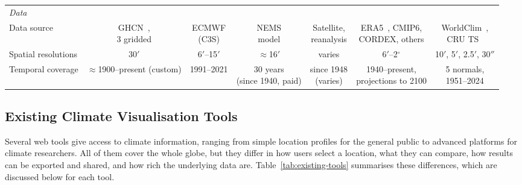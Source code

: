 \begin{table}
\begin{tabular*}{\textheight}{@{\extracolsep{\fill}}lcccccc}
    \midrule
    \multicolumn{7}{l}{\textit{Data}} \\
    Data source & \shortstack{GHCN~\cite{lawrimore2011ghcnm},\\3 gridded}
      & \shortstack{ECMWF\\(C3S)} & \shortstack{NEMS\\model} & \shortstack{Satellite,\\reanalysis}
      & \shortstack{ERA5~\cite{hersbach2020era5}, CMIP6,\\CORDEX, others}
      & \shortstack{WorldClim~\cite{fick2017worldclim},\\CRU TS~\cite{harris2020version}} \\
    Spatial resolutions & 30$'$ & 6$'$--15$'$ & $\approx$16$'$ & varies & 6$'$--2$^\circ$
      & 10$'$, 5$'$, 2.5$'$, 30$''$ \\
    Temporal coverage & \shortstack{$\approx$1900--present\\(custom)} & 1991--2021
      & \shortstack{30 years\\(since 1940, paid)} & \shortstack{since 1948\\(varies)}
      & \shortstack{1940--present,\\projections to 2100} & \shortstack{5 normals,\\1951--2024} \\
    \bottomrule
  \end{tabular*}
\end{table}

\subsection{Existing Climate Visualisation Tools}\label{sec:related:existing-tools}
Several web tools give access to climate information, ranging from simple location
profiles for the general public to advanced platforms for climate researchers. All of 
them cover the whole globe, but they differ in how users select a location, what they 
can compare, how results can be exported and shared, and how rich the underlying data are.
Table~\ref{tab:existing-tools} summarises these differences, which are discussed
below for each tool.

